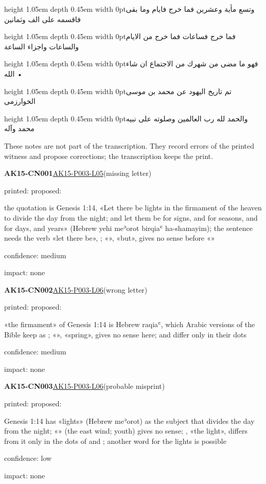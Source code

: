 \documentclass[11pt]{article}
\newcommand{\ArStrut}{\vrule height 1.05em depth 0.45em width 0pt}
\newcommand{\EdL}[3]{\par\noindent\hypertarget{#2}{}\llap{\footnotesize\color{gray}#1\hspace{4mm}}\parbox[t]{\linewidth}{\setRTL\ArBody\raggedleft\ArStrut #3\par}\par}
\newcommand{\EdLc}[3]{\par\noindent\hypertarget{#2}{}\llap{\footnotesize\color{gray}#1\hspace{4mm}}\parbox[t]{\linewidth}{\setRTL\ArBody\centering\ArStrut #3\par}\par}
\begin{document}
\EdL{10}{AK15-P010-L10}{وتسع مأية وعشرين فما خرج فايام وما بقى فاقسمه على الف وثمانين}
\EdL{11}{AK15-P010-L11}{فما خرج فساعات فما خرج من الايام والساعات واجزاء الساعة}
\EdL{12}{AK15-P010-L12}{فهو ما مضى من شهرك من الاجتماع ان شاء الله •}
\EdLc{13}{AK15-P010-L13}{تم تاريخ اليهود عن محمد بن موسى الخوارزمى}
\EdLc{14}{AK15-P010-L14}{والحمد لله رب العالمين وصلوته على نبيه محمد وآله}
\clearpage{}\par\medskip\noindent These notes are not part of the transcription. They record errors of the printed witness and propose corrections; the transcription keeps the print.\par\medskip
\noindent\textbf{AK15-CN001}\enspace\hyperlink{AK15-P003-L05}{AK15-P003-L05}\enspace(missing letter)\par\noindent printed: \enspace proposed: \par\noindent the quotation is Genesis 1:14, «Let there be lights in the firmament of the heaven to divide the day from the night; and let them be for signs, and for seasons, and for days, and years» (Hebrew yehi meʾorot birqiaʿ ha-shamayim); the sentence needs the verb «let there be», ; «», «but», gives no sense before «»\par\noindent confidence: medium\par\noindent impact: none\par\medskip
\noindent\textbf{AK15-CN002}\enspace\hyperlink{AK15-P003-L06}{AK15-P003-L06}\enspace(wrong letter)\par\noindent printed: \enspace proposed: \par\noindent «the firmament» of Genesis 1:14 is Hebrew raqiaʿ, which Arabic versions of the Bible keep as ; «», «spring», gives no sense here;  and  differ only in their dots\par\noindent confidence: medium\par\noindent impact: none\par\medskip
\noindent\textbf{AK15-CN003}\enspace\hyperlink{AK15-P003-L06}{AK15-P003-L06}\enspace(probable misprint)\par\noindent printed: \enspace proposed: \par\noindent Genesis 1:14 has «lights» (Hebrew meʾorot) as the subject that divides the day from the night; «» (the east wind; youth) gives no sense; , «the light», differs from it only in the dots of  and ; another word for the lights is possible\par\noindent confidence: low\par\noindent impact: none\par\medskip
\end{document}
